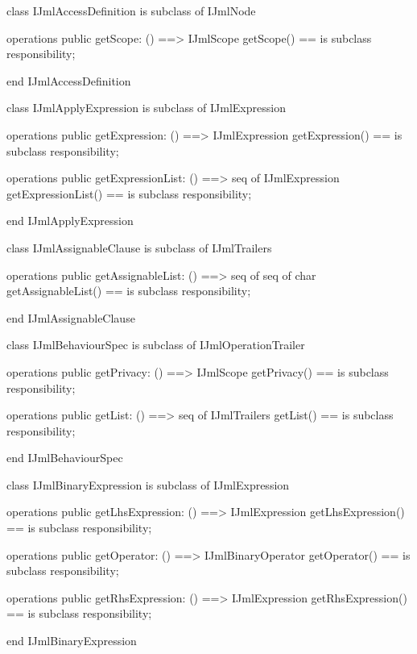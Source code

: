 \begin{vdm_al}
class IJmlAccessDefinition
 is subclass of IJmlNode

operations
  public getScope: () ==> IJmlScope
  getScope() == is subclass responsibility;

end IJmlAccessDefinition
\end{vdm_al}

\begin{vdm_al}
class IJmlApplyExpression
 is subclass of IJmlExpression

operations
  public getExpression: () ==> IJmlExpression
  getExpression() == is subclass responsibility;

operations
  public getExpressionList: () ==> seq of IJmlExpression
  getExpressionList() == is subclass responsibility;

end IJmlApplyExpression
\end{vdm_al}

\begin{vdm_al}
class IJmlAssignableClause
 is subclass of IJmlTrailers

operations
  public getAssignableList: () ==> seq of seq of char
  getAssignableList() == is subclass responsibility;

end IJmlAssignableClause
\end{vdm_al}

\begin{vdm_al}
class IJmlBehaviourSpec
 is subclass of IJmlOperationTrailer

operations
  public getPrivacy: () ==> IJmlScope
  getPrivacy() == is subclass responsibility;

operations
  public getList: () ==> seq of IJmlTrailers
  getList() == is subclass responsibility;

end IJmlBehaviourSpec
\end{vdm_al}

\begin{vdm_al}
class IJmlBinaryExpression
 is subclass of IJmlExpression

operations
  public getLhsExpression: () ==> IJmlExpression
  getLhsExpression() == is subclass responsibility;

operations
  public getOperator: () ==> IJmlBinaryOperator
  getOperator() == is subclass responsibility;

operations
  public getRhsExpression: () ==> IJmlExpression
  getRhsExpression() == is subclass responsibility;

end IJmlBinaryExpression
\end{vdm_al}

